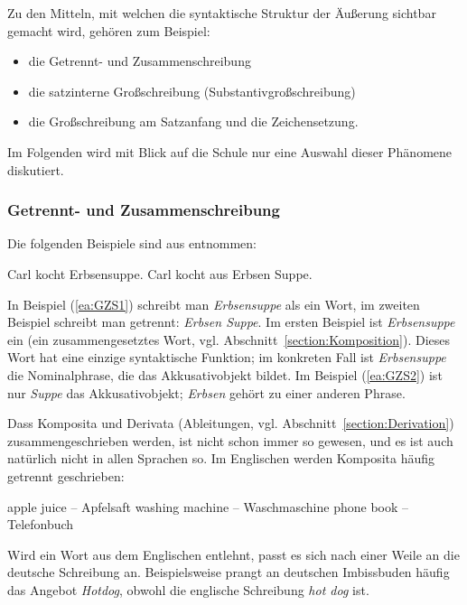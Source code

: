 Zu den Mitteln, mit welchen die syntaktische Struktur der Äußerung sichtbar gemacht wird, gehören zum Beispiel:
\begin{itemize}
    \item die Getrennt- und Zusammenschreibung
    \item die satzinterne Großschreibung (Substantivgroßschreibung)
    \item die Großschreibung am Satzanfang und die Zeichensetzung.
\end{itemize}

Im Folgenden wird mit Blick auf die Schule nur eine Auswahl dieser Phänomene diskutiert.

\subsubsection{Getrennt- und Zusammenschreibung}\label{sec:Getrennt_Zusammen}

Die folgenden Beispiele sind aus \citet[258]{FuhrhopPeters2013} entnommen:

\ea \label{GZS}
\ea \label{ea:GZS1} Carl kocht Erbsensuppe.
\ex \label{ea:GZS2} Carl kocht aus Erbsen Suppe.
\z
\z

In Beispiel (\ref{ea:GZS1}) schreibt man \textit{Erbsensuppe} als ein Wort, im zweiten Beispiel schreibt man getrennt: \textit{Erbsen Suppe}. Im ersten Beispiel ist \textit{Erbsensuppe} ein  (ein zusammengesetztes Wort, vgl. Abschnitt~\ref{section:Komposition}). Dieses Wort hat eine einzige syntaktische Funktion; im konkreten Fall ist \textit{Erbsensuppe} die Nominalphrase, die das Akkusativobjekt bildet. Im Beispiel (\ref{ea:GZS2}) ist nur \textit{Suppe} das Akkusativobjekt; \textit{Erbsen} gehört zu einer anderen Phrase.

Dass Komposita und Derivata (Ableitungen, vgl. Abschnitt~\ref{section:Derivation}) zusammengeschrieben werden, ist nicht schon immer so gewesen, und es ist auch natürlich nicht in allen Sprachen so. Im Englischen werden Komposita häufig getrennt geschrieben:

\ea \label{GZSKomposita}
\ea \label{ea:GZS1Komposita} apple juice -- Apfelsaft
\ex \label{ea:GZS2Komposita} washing machine -- Waschmaschine
\ex \label{ea:GZS3Komposita} phone book -- Telefonbuch
\z
\z

Wird ein Wort aus dem Englischen entlehnt, passt es sich nach einer Weile an die deutsche Schreibung an. Beispielsweise prangt an deutschen Imbissbuden häufig das Angebot \textit{Hotdog}, obwohl die englische Schreibung \textit{hot dog} ist.

